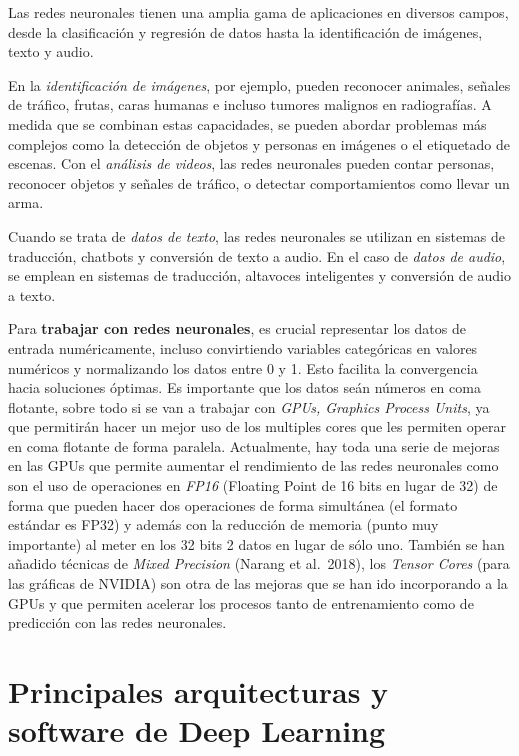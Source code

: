 \documentclass[
  a4paper,
  DIV=11,
  numbers=noendperiod]{scrreprt}
\begin{document}
Las redes neuronales tienen una amplia gama de aplicaciones en diversos
campos, desde la clasificación y regresión de datos hasta la
identificación de imágenes, texto y audio.

En la \emph{identificación de imágenes}, por ejemplo, pueden reconocer
animales, señales de tráfico, frutas, caras humanas e incluso tumores
malignos en radiografías. A medida que se combinan estas capacidades, se
pueden abordar problemas más complejos como la detección de objetos y
personas en imágenes o el etiquetado de escenas. Con el \emph{análisis
de videos}, las redes neuronales pueden contar personas, reconocer
objetos y señales de tráfico, o detectar comportamientos como llevar un
arma.

Cuando se trata de \emph{datos de texto}, las redes neuronales se
utilizan en sistemas de traducción, chatbots y conversión de texto a
audio. En el caso de \emph{datos de audio}, se emplean en sistemas de
traducción, altavoces inteligentes y conversión de audio a texto.

Para \textbf{trabajar con redes neuronales}, es crucial representar los
datos de entrada numéricamente, incluso convirtiendo variables
categóricas en valores numéricos y normalizando los datos entre 0 y 1.
Esto facilita la convergencia hacia soluciones óptimas. Es importante
que los datos seán números en coma flotante, sobre todo si se van a
trabajar con \emph{GPUs, Graphics Process Units}, ya que permitirán
hacer un mejor uso de los multiples cores que les permiten operar en
coma flotante de forma paralela. Actualmente, hay toda una serie de
mejoras en las GPUs que permite aumentar el rendimiento de las redes
neuronales como son el uso de operaciones en \emph{FP16} (Floating Point
de 16 bits en lugar de 32) de forma que pueden hacer dos operaciones de
forma simultánea (el formato estándar es FP32) y además con la reducción
de memoria (punto muy importante) al meter en los 32 bits 2 datos en
lugar de sólo uno. También se han añadido técnicas de \emph{Mixed
Precision} (Narang et al.~2018), los \emph{Tensor Cores} (para las
gráficas de NVIDIA) son otra de las mejoras que se han ido incorporando
a la GPUs y que permiten acelerar los procesos tanto de entrenamiento
como de predicción con las redes neuronales.

\section{Principales arquitecturas y software de Deep
Learning}\label{principales-arquitecturas-y-software-de-deep-learning}
\end{document}
